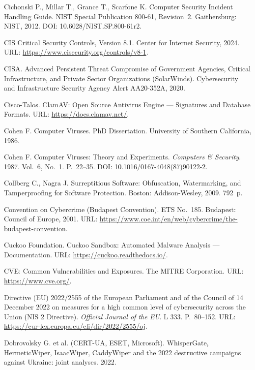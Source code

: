  Cichonski P., Millar T., Grance T., Scarfone K. Computer Security Incident Handling Guide. NIST Special Publication 800-61, Revision~2. Gaithersburg: NIST, 2012. DOI: 10.6028/NIST.SP.800-61r2.

 CIS Critical Security Controls, Version 8.1. Center for Internet Security, 2024. URL: \url{https://www.cisecurity.org/controls/v8-1}.

 CISA. Advanced Persistent Threat Compromise of Government Agencies, Critical Infrastructure, and Private Sector Organizations (SolarWinds). Cybersecurity and Infrastructure Security Agency Alert AA20-352A, 2020.

 Cisco-Talos. ClamAV: Open Source Antivirus Engine --- Signatures and Database Formats. URL: \url{https://docs.clamav.net/}.

 Cohen F. Computer Viruses. PhD Dissertation. University of Southern California, 1986.

 Cohen F. Computer Viruses: Theory and Experiments. \emph{Computers \& Security}. 1987. Vol.~6, No.~1. P.~22--35. DOI: 10.1016/0167-4048(87)90122-2.

 Collberg C., Nagra J. Surreptitious Software: Obfuscation, Watermarking, and Tamperproofing for Software Protection. Boston: Addison-Wesley, 2009. 792~p.

 Convention on Cybercrime (Budapest Convention). ETS No.~185. Budapest: Council of Europe, 2001. URL: \url{https://www.coe.int/en/web/cybercrime/the-budapest-convention}.

 Cuckoo Foundation. Cuckoo Sandbox: Automated Malware Analysis --- Documentation. URL: \url{https://cuckoo.readthedocs.io/}.

 CVE: Common Vulnerabilities and Exposures. The MITRE Corporation. URL: \url{https://www.cve.org/}.

 Directive (EU) 2022/2555 of the European Parliament and of the Council of 14 December 2022 on measures for a high common level of cybersecurity across the Union (NIS 2 Directive). \emph{Official Journal of the EU}. L 333. P.~80--152. URL: \url{https://eur-lex.europa.eu/eli/dir/2022/2555/oj}.

 Dobrovolsky G. et al. (CERT-UA, ESET, Microsoft). WhisperGate, HermeticWiper, IsaacWiper, CaddyWiper and the 2022 destructive campaigns against Ukraine: joint analyses. 2022.

